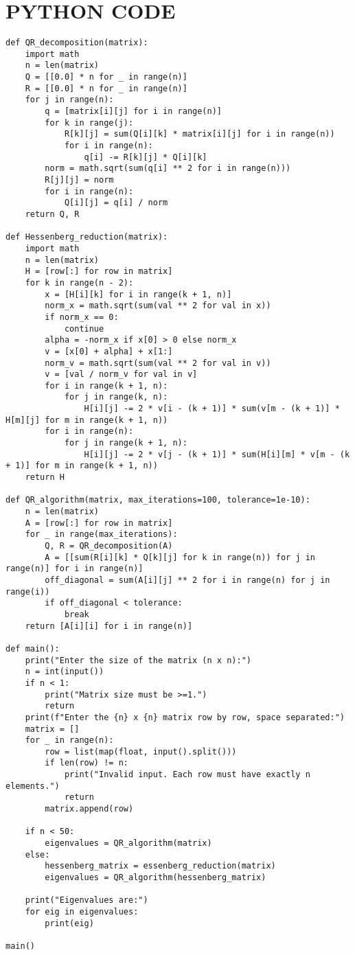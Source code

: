 \documentclass[journal]{IEEEtran}
\begin{document}
\section{\textbf{PYTHON CODE}}
\begin{lstlisting}[caption={QR Algorithm}]
def QR_decomposition(matrix):
    import math
    n = len(matrix)
    Q = [[0.0] * n for _ in range(n)]
    R = [[0.0] * n for _ in range(n)]
    for j in range(n):
        q = [matrix[i][j] for i in range(n)]
        for k in range(j):
            R[k][j] = sum(Q[i][k] * matrix[i][j] for i in range(n))
            for i in range(n):
                q[i] -= R[k][j] * Q[i][k]
        norm = math.sqrt(sum(q[i] ** 2 for i in range(n)))
        R[j][j] = norm
        for i in range(n):
            Q[i][j] = q[i] / norm 
    return Q, R

def Hessenberg_reduction(matrix):
    import math
    n = len(matrix)
    H = [row[:] for row in matrix] 
    for k in range(n - 2):
        x = [H[i][k] for i in range(k + 1, n)]
        norm_x = math.sqrt(sum(val ** 2 for val in x))
        if norm_x == 0:
            continue
        alpha = -norm_x if x[0] > 0 else norm_x
        v = [x[0] + alpha] + x[1:]
        norm_v = math.sqrt(sum(val ** 2 for val in v))
        v = [val / norm_v for val in v]
        for i in range(k + 1, n):
            for j in range(k, n):
                H[i][j] -= 2 * v[i - (k + 1)] * sum(v[m - (k + 1)] * H[m][j] for m in range(k + 1, n))
        for i in range(n):
            for j in range(k + 1, n):
                H[i][j] -= 2 * v[j - (k + 1)] * sum(H[i][m] * v[m - (k + 1)] for m in range(k + 1, n))
    return H

def QR_algorithm(matrix, max_iterations=100, tolerance=1e-10):
    n = len(matrix) 
    A = [row[:] for row in matrix]  
    for _ in range(max_iterations):
        Q, R = QR_decomposition(A)
        A = [[sum(R[i][k] * Q[k][j] for k in range(n)) for j in range(n)] for i in range(n)]
        off_diagonal = sum(A[i][j] ** 2 for i in range(n) for j in range(i))
        if off_diagonal < tolerance:
            break
    return [A[i][i] for i in range(n)]

def main():
    print("Enter the size of the matrix (n x n):")
    n = int(input())
    if n < 1:
        print("Matrix size must be >=1.")
        return
    print(f"Enter the {n} x {n} matrix row by row, space separated:")
    matrix = []
    for _ in range(n):
        row = list(map(float, input().split()))
        if len(row) != n:
            print("Invalid input. Each row must have exactly n elements.")
            return
        matrix.append(row)

    if n < 50:
        eigenvalues = QR_algorithm(matrix)
    else:
        hessenberg_matrix = essenberg_reduction(matrix)
        eigenvalues = QR_algorithm(hessenberg_matrix)

    print("Eigenvalues are:")
    for eig in eigenvalues:
        print(eig)

main()
\end{lstlisting}\vspace{2cm}
\end{document}
